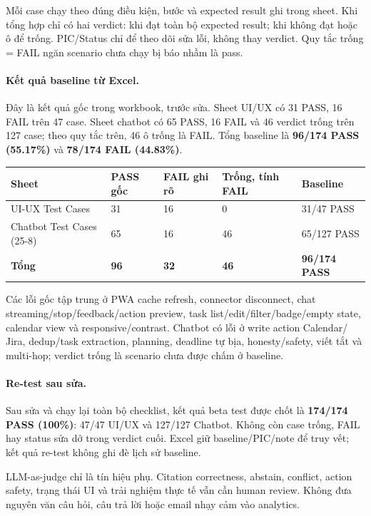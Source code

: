 \documentclass[12pt,a4paper]{article}
\begin{document}
Mỗi case chạy theo đúng điều kiện, bước và expected result ghi trong sheet.
Khi tổng hợp chỉ có hai verdict:  khi đạt toàn bộ expected result;
 khi không đạt hoặc ô  để trống. PIC/Status chỉ để
theo dõi sửa lỗi, không thay verdict. Quy tắc trống = FAIL ngăn scenario chưa
chạy bị báo nhầm là pass.

\paragraph{Kết quả baseline từ Excel.} Đây là kết quả gốc trong workbook,
trước sửa. Sheet UI/UX có 31 PASS, 16 FAIL trên 47 case. Sheet chatbot có 65
PASS, 16 FAIL và 46 verdict trống trên 127 case; theo quy tắc trên, 46 ô trống
là FAIL. Tổng baseline là \textbf{96/174 PASS (55.17\%)} và
\textbf{78/174 FAIL (44.83\%)}.

\begin{longtable}{p{3.7cm}p{2cm}p{2cm}p{2.4cm}p{2.5cm}}
\toprule Sheet & PASS gốc & FAIL ghi rõ & Trống, tính FAIL & Baseline \\ \midrule
\endhead
UI-UX Test Cases & 31 & 16 & 0 & 31/47 PASS \\
Chatbot Test Cases (25-8) & 65 & 16 & 46 & 65/127 PASS \\
\textbf{Tổng} & \textbf{96} & \textbf{32} & \textbf{46} & \textbf{96/174 PASS} \\
\bottomrule
\end{longtable}

Các lỗi gốc tập trung ở PWA cache refresh, connector disconnect, chat
streaming/stop/feedback/action preview, task list/edit/filter/badge/empty state,
calendar view và responsive/contrast. Chatbot có lỗi ở write action Calendar/
Jira, dedup/task extraction, planning, deadline tự bịa, honesty/safety, viết tắt
và multi-hop; verdict trống là scenario chưa được chấm ở baseline.

\paragraph{Re-test sau sửa.} Sau sửa và chạy lại toàn bộ checklist, kết quả
beta test được chốt là \textbf{174/174 PASS (100\%)}: 47/47 UI/UX và 127/127
Chatbot. Không còn case trống, FAIL hay status sửa dở trong verdict cuối. Excel
giữ baseline/PIC/note để truy vết; kết quả re-test không ghi đè lịch sử baseline.

LLM-as-judge chỉ là tín hiệu phụ. Citation correctness, abstain, conflict,
action safety, trạng thái UI và trải nghiệm thực tế vẫn cần human review.
Không đưa nguyên văn câu hỏi, câu trả lời hoặc email nhạy cảm vào analytics.
\end{document}
